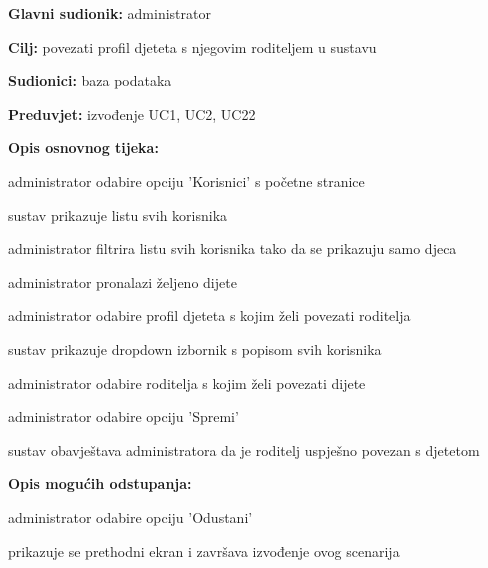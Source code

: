                     \noindent {}
					\begin{packed_item}
	
						\item \textbf{Glavni sudionik: }administrator
						\item  \textbf{Cilj:} povezati profil djeteta s njegovim roditeljem u sustavu
						\item  \textbf{Sudionici:} baza podataka
						\item  \textbf{Preduvjet:} izvođenje UC1, UC2, UC22
						\item  \textbf{Opis osnovnog tijeka:}
						
						\item[] \begin{packed_enum}
							\item administrator odabire opciju 'Korisnici' s početne stranice
							\item sustav prikazuje listu svih korisnika
							\item administrator filtrira listu svih korisnika tako da se prikazuju samo djeca
							\item administrator pronalazi željeno dijete
							\item administrator odabire profil djeteta s kojim želi povezati roditelja
							\item sustav prikazuje dropdown izbornik s popisom svih korisnika
							\item administrator odabire roditelja s kojim želi povezati dijete
							\item administrator odabire opciju 'Spremi'
							\item sustav obavještava administratora da je roditelj uspješno povezan s djetetom
						
						\end{packed_enum}
						\item  \textbf{Opis mogućih odstupanja:}
						
						\item[] \begin{packed_item}
							\item[8.a] administrator odabire opciju 'Odustani'
							\item [] \begin{packed_enum}
								\item prikazuje se prethodni ekran i završava izvođenje ovog scenarija
							\end{packed_enum}
						\end{packed_item}
					\end{packed_item}
                    
